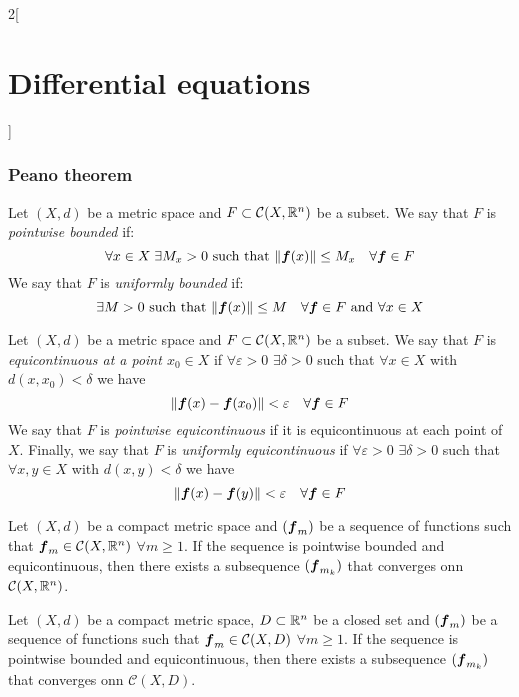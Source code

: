 \documentclass[../../../main.tex]{subfiles}
\begin{document}
\begin{multicols}{2}[\section{Differential equations}]
  \subsubsection*{Peano theorem}
  \begin{definition}
    Let $(X,d)$ be a metric space and $F\subset\mathcal{C}(X,\mathbb{R}^n)$ be a subset. We say that $F$ is \textit{pointwise bounded} if: $$\forall x\in X\;\exists M_x>0\text{ such that }\|\boldsymbol{f}(x)\|\leq M_x\quad\forall\boldsymbol{f}\in F$$
    We say that $F$ is \textit{uniformly bounded} if: $$\exists M>0\text{ such that }\|\boldsymbol{f}(x)\|\leq M \quad\forall\boldsymbol{f}\in F\text{ and }\forall x\in X$$
  \end{definition}
  \begin{definition}
    Let $(X,d)$ be a metric space and $F\subset\mathcal{C}(X,\mathbb{R}^n)$ be a subset. We say that $F$ is \textit{equicontinuous at a point $x_0\in X$} if $\forall \varepsilon>0$ $\exists \delta>0$ such that $\forall x\in X$ with $d(x,x_0)<\delta$ we have $$\|\boldsymbol{f}(x)-\boldsymbol{f}(x_0)\|<\varepsilon\quad\forall\boldsymbol{f}\in F$$
    We say that $F$ is \textit{pointwise equicontinuous} if it is equicontinuous at each point of $X$. Finally, we say that $F$ is \textit{uniformly equicontinuous} if $\forall \varepsilon>0$ $\exists \delta>0$ such that $\forall x,y\in X$ with $d(x,y)<\delta$ we have $$\|\boldsymbol{f}(x)-\boldsymbol{f}(y)\|<\varepsilon\quad\forall\boldsymbol{f}\in F$$
  \end{definition}
  \begin{theorem}
    Let $(X,d)$ be a compact metric space and $(\boldsymbol{f}_m)$ be a sequence of functions such that $\boldsymbol{f}_m\in\mathcal{C}(X,\mathbb{R}^n)$ $\forall m\geq 1$. If the sequence is pointwise bounded and equicontinuous, then there exists a subsequence $(\boldsymbol{f}_{m_k})$ that converges onn $\mathcal{C}(X,\mathbb{R}^n)$.
  \end{theorem}
  \begin{corollary}
    Let $(X,d)$ be a compact metric space, $D\subset\mathbb{R}^n$ be a closed set and $(\boldsymbol{f}_m)$ be a sequence of functions such that $\boldsymbol{f}_m\in\mathcal{C}(X,D)$ $\forall m\geq 1$. If the sequence is pointwise bounded and equicontinuous, then there exists a subsequence $(\boldsymbol{f}_{m_k})$ that converges onn $\mathcal{C}(X,D)$.
  \end{corollary}
  \begin{theorem}

\end{theorem}
\end{multicols}
\end{document}
